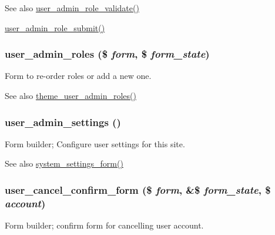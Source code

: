 \begin{DoxySeeAlso}{See also}
\hyperlink{user_8admin_8inc_ad03d629a48434e2a62448d3ef2dec1bd}{user\_\-admin\_\-role\_\-validate()} 

\hyperlink{user_8admin_8inc_ac85f25cd1c59104fcc4dc4f7b9dfbd2e}{user\_\-admin\_\-role\_\-submit()} 
\end{DoxySeeAlso}
\hypertarget{group__forms_ga80c86a9ecd42e3a8b2518d23cf9b0b84}{
\subsubsection[{user\_\-admin\_\-roles}]{\setlength{\rightskip}{0pt plus 5cm}user\_\-admin\_\-roles (\$ {\em form}, \/  \$ {\em form\_\-state})}}
\label{group__forms_ga80c86a9ecd42e3a8b2518d23cf9b0b84}
Form to re-\/order roles or add a new one.

\begin{DoxySeeAlso}{See also}
\hyperlink{group__themeable_gad4ed00385370ab78b0edbc7ec01b729f}{theme\_\-user\_\-admin\_\-roles()} 
\end{DoxySeeAlso}
\hypertarget{group__forms_ga8cb1bc70278e0e628fd17c2ec8353bd1}{
\subsubsection[{user\_\-admin\_\-settings}]{\setlength{\rightskip}{0pt plus 5cm}user\_\-admin\_\-settings ()}}
\label{group__forms_ga8cb1bc70278e0e628fd17c2ec8353bd1}
Form builder; Configure user settings for this site.

\begin{DoxySeeAlso}{See also}
\hyperlink{group__forms_ga6fb270d34465d846cd4659a85d3e40c8}{system\_\-settings\_\-form()} 
\end{DoxySeeAlso}
\hypertarget{group__forms_ga75a9df042449e7fc294c418083052114}{
\subsubsection[{user\_\-cancel\_\-confirm\_\-form}]{\setlength{\rightskip}{0pt plus 5cm}user\_\-cancel\_\-confirm\_\-form (\$ {\em form}, \/  \&\$ {\em form\_\-state}, \/  \$ {\em account})}}
\label{group__forms_ga75a9df042449e7fc294c418083052114}
Form builder; confirm form for cancelling user account.


